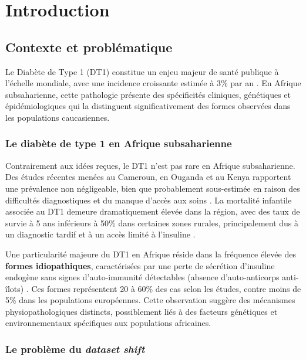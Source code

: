 \chapter{Introduction}
\label{chap:introduction}

\section{Contexte et problématique}

Le Diabète de Type 1 (DT1) constitue un enjeu majeur de santé publique à l'échelle mondiale, avec une incidence croissante estimée à 3\% par an \cite{DiabetesAtlas2021}. En Afrique subsaharienne, cette pathologie présente des spécificités cliniques, génétiques et épidémiologiques qui la distinguent significativement des formes observées dans les populations caucasiennes.

\subsection{Le diabète de type 1 en Afrique subsaharienne}

Contrairement aux idées reçues, le DT1 n'est pas rare en Afrique subsaharienne. Des études récentes menées au Cameroun, en Ouganda et au Kenya rapportent une prévalence non négligeable, bien que probablement sous-estimée en raison des difficultés diagnostiques et du manque d'accès aux soins \cite{Mbanya2010,Katte2023}. La mortalité infantile associée au DT1 demeure dramatiquement élevée dans la région, avec des taux de survie à 5 ans inférieurs à 50\% dans certaines zones rurales, principalement dus à un diagnostic tardif et à un accès limité à l'insuline \cite{Atun2017}.

Une particularité majeure du DT1 en Afrique réside dans la fréquence élevée des \textbf{formes idiopathiques}, caractérisées par une perte de sécrétion d'insuline endogène sans signes d'auto-immunité détectables (absence d'auto-anticorps anti-îlots) \cite{Sobngwi2002}. Ces formes représentent 20 à 60\% des cas selon les études, contre moins de 5\% dans les populations européennes. Cette observation suggère des mécanismes physiopathologiques distincts, possiblement liés à des facteurs génétiques et environnementaux spécifiques aux populations africaines.

\subsection{Le problème du \textit{dataset shift}}

